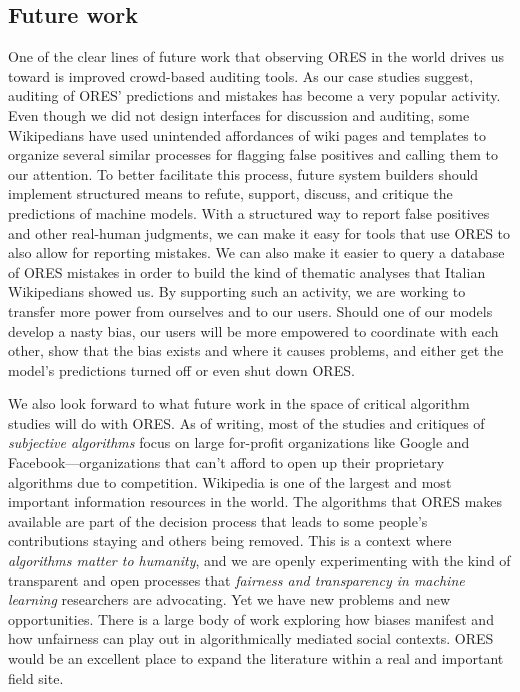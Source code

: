 \subsection{Future work}
One of the clear lines of future work that observing ORES in the world drives us toward is improved crowd-based auditing tools.  As our case studies suggest, auditing of ORES' predictions and mistakes has become a very popular activity. Even though we did not design interfaces for discussion and auditing, some Wikipedians have used unintended affordances of wiki pages and templates to organize several similar processes for flagging false positives and calling them to our attention.  To better facilitate this process, future system builders should implement structured means to refute, support, discuss, and critique the predictions of machine models.  With a structured way to report false positives and other real-human judgments, we can make it easy for tools that use ORES to also allow for reporting mistakes.  We can also make it easier to query a database of ORES mistakes in order to build the kind of thematic analyses that Italian Wikipedians showed us.  By supporting such an activity, we are working to transfer more power from ourselves and to our users.  Should one of our models develop a nasty bias, our users will be more empowered to coordinate with each other, show that the bias exists and where it causes problems, and either get the model's predictions turned off or even shut down ORES.

We also look forward to what future work in the space of critical algorithm studies will do with ORES.  As of writing, most of the studies and critiques of \emph{subjective algorithms}\cite{tufekci2015algorithms} focus on large for-profit organizations like Google and Facebook---organizations that can't afford to open up their proprietary algorithms due to competition.  Wikipedia is one of the largest and most important information resources in the world.  The algorithms that ORES makes available are part of the decision process that leads to some people's contributions staying and others being removed.  This is a context where \emph{algorithms matter to humanity}, and we are openly experimenting with the kind of transparent and open processes that \emph{fairness and transparency in machine learning} researchers are advocating.  Yet we have new problems and new opportunities.  There is a large body of work exploring how biases manifest and how unfairness can play out in algorithmically mediated social contexts.  ORES would be an excellent place to expand the literature within a real and important field site.

